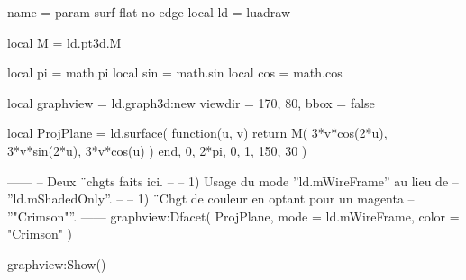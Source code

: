 \documentclass[border = 3pt]{standalone}
\begin{document}
\begin{luadraw*}{name = param-surf-flat-no-edge}
local ld = luadraw

local M = ld.pt3d.M

local pi  = math.pi
local sin = math.sin
local cos = math.cos

local graphview = ld.graph3d:new{
  viewdir = {170, 80},
  bbox    = false
}

local ProjPlane = ld.surface(
  function(u, v)
    return M(
      3*v*cos(2*u),
      3*v*sin(2*u),
      3*v*cos(u)
    )
  end,
  0, 2*pi, 0, 1,
  {150, 30}
)

------
-- Deux ¨chgts faits ici.
--
--     1) Usage du mode ''ld.mWireFrame'' au lieu de
--     ''ld.mShadedOnly''.
--
--     1) ¨Chgt de couleur en optant pour un magenta
--     ''"Crimson"''.
------
graphview:Dfacet(
  ProjPlane,
  {
    mode  = ld.mWireFrame,
    color = "Crimson"
  }
)

graphview:Show()
\end{luadraw*}
\end{document}
